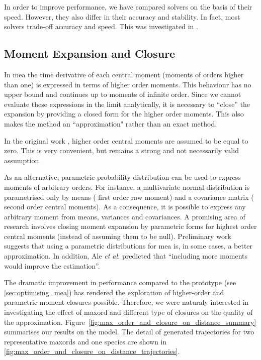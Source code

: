 In order to improve performance, we have compared solvers on the basis of their speed.
However, they also differ in their accuracy and stability. 
In fact, most solvers trade-off accuracy and speed\cite{sandu_benchmarking_1997}.
This was investigated in  .

\subsection{Moment Expansion and Closure}

In \gls{mea} the time derivative of each central moment (moments of orders higher than one) is expressed in terms of higher order moments.
This behaviour has no upper bound and continues up to moments of infinite order.
Since we cannot evaluate these expressions in the limit analytically, it is necessary to ``close'' the expansion by providing a closed form for the higher order moments.
This also makes the method an ``approximation" rather than an exact method.

In the original work \cite{ale_general_2013}, higher order central moments are assumed to be equal to zero.
This is very convenient, but remains a strong and not necessarily valid assumption.

As an alternative, parametric probability distribution can be used to express moments of arbitrary orders.
For instance, a multivariate normal distribution is parametrised only by means (\ie{} first order raw moment)
and a covariance matrix (\ie{} second order central moments).
As a consequence, it is possible to express any arbitrary moment from means, variances and covariances.
A promising area of research involves closing moment expansion by parametric forms for highest order central moments (instead of assuming them to be null).
Preliminary work \cite{lakatos_preparation_2014} suggests that using a parametric distributions for \gls{mea} is, in some cases, a better approximation.
In addition, Ale \emph{et al.} predicted that ``including more moments would improve the estimation''\cite{ale_general_2013}.

The dramatic improvement in performance compared to the \mat{} prototype (see \autoref{sec:optimising_mea}) has rendered the exploration of higher-order and parametric moment closures possible.
Therefore, we were naturaly interested in investigating the effect of \gls{maxord} and different type of closures on the quality of the approximation.
Figure~\ref{fig:max_order_and_closure_on_distance_summary} summarises our results on the \pft{} model. 
The detail of generated trajectories for two representative \gls{maxord}s and one species are shown in
\autoref{fig:max_order_and_closure_on_distance_trajectories}.

